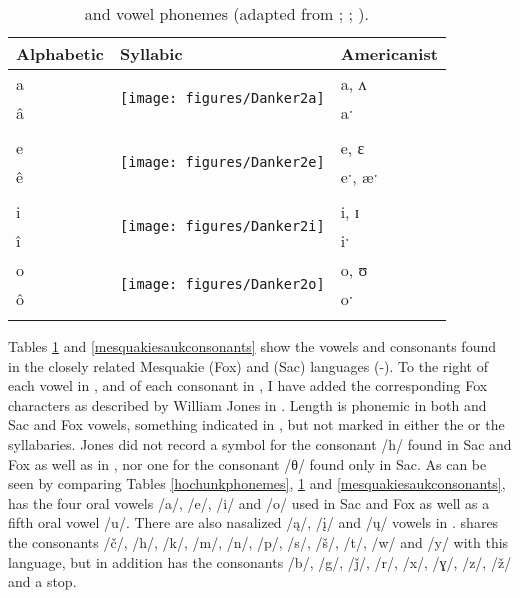 \documentclass[output=paper]{LSP/langsci}
\begin{document}
\begin{table}
\begin{tabular}{lll}
\lsptoprule
Alphabetic & Syllabic & Americanist\\
\midrule
a & \multirow{2}{*}{\texttt{[image: figures/Danker2a]}} & a, ʌ\\
â && aˑ\\ \\
e & \multirow{2}{*}{\texttt{[image: figures/Danker2e]}} & e, ɛ\\
ê && eˑ, æˑ\\ \\
i & \multirow{2}{*}{\texttt{[image: figures/Danker2i]}} & i, ɪ\\
î && iˑ\\
o & \multirow{2}{*}{\texttt{[image: figures/Danker2o]}} & o, ʊ\\
ô && oˑ\\
\lspbottomrule
\end{tabular}
\caption{ and  vowel phonemes (adapted from \citealt{NatLangMeskSauk}; \citealt{Susman1939}; \citealt{Jones1906}).}
\label{mesquakiesaukvowels}
\end{table}

\largerpage
Tables \ref{mesquakiesaukvowels} and \ref{mesquakiesaukconsonants} show the vowels and consonants found in the closely related Mes\-qua\-kie (Fox) and  (Sac) languages (-). To the right of each vowel in , and of each consonant in , I have added the corresponding Fox  characters as described by William Jones in \citeyear{Jones1906}. Length is phonemic in both  and Sac and Fox vowels, something indicated in , but not marked in either the  or the  syllabaries. Jones did not record a  symbol for the consonant /h/ found in Sac and Fox as well as in , nor one for the consonant /θ/ found only in Sac. As can be seen by comparing Tables \ref{hochunkphonemes}, \ref{mesquakiesaukvowels} and \ref{mesquakiesaukconsonants},  has the four oral vowels /a/, /e/, /i/ and /o/ used in Sac and Fox as well as a fifth  oral vowel /u/. There are also nasalized /\k{a}/, /\k{i}/ and /\k{u}/ vowels in .  shares the consonants /č/, /h/, /k/, /m/, /n/, /p/, /s/, /\v{s}/, /t/, /w/ and /y/ with this  language, but in addition has the consonants /b/, /g/, /\v{j}/, /r/, /x/, /ɣ/, /z/, /\v{z}/ and a  stop.
\end{document}
